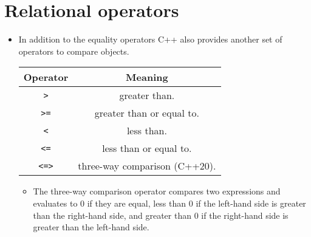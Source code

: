 \section{Relational operators}
\begin{itemize}
    \item In addition to the equality operators C++ also provides another set of operators to compare objects.
        \begin{center}
            \begin{tabular}{ |c|c| }
                \hline
                    Operator & Meaning \\
                \hline
                    \texttt{>} & greater than. \\ 
                    \texttt{>=} & greater than or equal to. \\ 
                    \texttt{<} & less than. \\ 
                    \texttt{<=} & less than or equal to. \\ 
                    \texttt{<=>} & three-way comparison (C++20). \\ 
                \hline
            \end{tabular}
        \end{center}
        \begin{itemize}
            \item The three-way comparison operator compares two expressions and evaluates to 0 if they are equal, less than 0 if the left-hand side is greater than the right-hand side, and greater than 0 if the right-hand side is greater than the left-hand side.
        \end{itemize}
\end{itemize}

